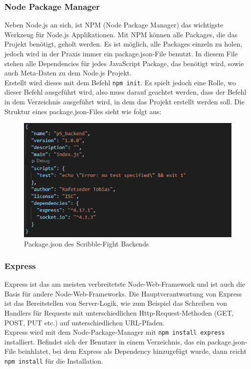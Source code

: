 \subsubsection{Node Package Manager}\label{NPM}
Neben Node.js an sich, ist NPM (Node Package Manager) das wichtigste Werkzeug für Node.js Applikationen. Mit NPM können alle Packages, die das Projekt benötigt, geholt werden.
Es ist möglich, alle Packages einzeln zu holen, jedoch wird in der Praxis immer ein package.json-File benutzt. In diesem File stehen alle Dependencies für jedes JavaScript Package,
das benötigt wird, sowie auch Meta-Daten zu dem Node.js Projekt. \cite{node_environment}  \\
Erstellt wird dieses mit dem Befehl \texttt{npm init}. Es spielt jedoch eine Rolle, wo dieser Befehl ausgeführt wird, also muss darauf geachtet werden, dass der Befehl in dem Verzeichnis ausgeführt wird, in dem das Projekt erstellt werden soll.
Die Struktur eines package.json-Files sieht wie folgt aus:
\begin{figure}[H]
    \centering
    \includegraphics[scale=1]{pics/package json.PNG}
    \caption{Package.json des Scribble-Fight Backends}
\end{figure}

\subsubsection{Express}
Express ist das am meisten verbreitetste Node-Web-Framework und ist auch die Basis für andere Node-Web-Frameworks. Die Hauptverantwortung
von Express ist das Bereitstellen von Server-Logik, wie zum Beispiel das Schreiben von Handlers für Requests mit unterschiedlichen Http-Request-Methoden (GET, POST, PUT etc.) auf unterschiedlichen URL-Pfaden. \cite{node_environment} \\
Express wird mit dem Node-Package-Manager mit \texttt{npm install express} installiert. Befindet sich der Benutzer in
einem Verzeichnis, das ein package.json-File beinhlatet, bei dem Express als Dependency hinzugefügt wurde, dann reicht \texttt{npm install} für die Installation.


